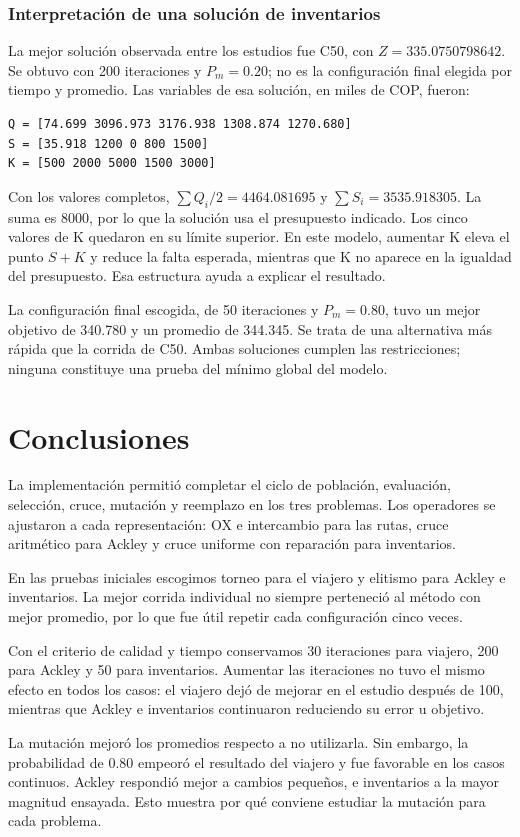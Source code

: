 \documentclass[conference]{IEEEtran}
\begin{document}
\subsubsection{Interpretación de una solución de inventarios}
La mejor solución observada entre los estudios fue C50, con $Z=335.0750798642$. Se obtuvo con 200 iteraciones y $P_m=0.20$; no es la configuración final elegida por tiempo y promedio.
Las variables de esa solución, en miles de COP, fueron:
\begin{lstlisting}
Q = [74.699 3096.973 3176.938 1308.874 1270.680]
S = [35.918 1200 0 800 1500]
K = [500 2000 5000 1500 3000]
\end{lstlisting}
Con los valores completos, $\sum Q_i/2=4464.081695$ y $\sum S_i=3535.918305$. La suma es 8000, por lo que la solución usa el presupuesto indicado. Los cinco valores de K quedaron en su límite superior. En este modelo, aumentar K eleva el punto $S+K$ y reduce la falta esperada, mientras que K no aparece en la igualdad del presupuesto. Esa estructura ayuda a explicar el resultado.

La configuración final escogida, de 50 iteraciones y $P_m=0.80$, tuvo un mejor objetivo de 340.780 y un promedio de 344.345. Se trata de una alternativa más rápida que la corrida de C50. Ambas soluciones cumplen las restricciones; ninguna constituye una prueba del mínimo global del modelo.
\section{Conclusiones}
La implementación permitió completar el ciclo de población, evaluación, selección, cruce, mutación y reemplazo en los tres problemas. Los operadores se ajustaron a cada representación: OX e intercambio para las rutas, cruce aritmético para Ackley y cruce uniforme con reparación para inventarios.

En las pruebas iniciales escogimos torneo para el viajero y elitismo para Ackley e inventarios. La mejor corrida individual no siempre perteneció al método con mejor promedio, por lo que fue útil repetir cada configuración cinco veces.

Con el criterio de calidad y tiempo conservamos 30 iteraciones para viajero, 200 para Ackley y 50 para inventarios. Aumentar las iteraciones no tuvo el mismo efecto en todos los casos: el viajero dejó de mejorar en el estudio después de 100, mientras que Ackley e inventarios continuaron reduciendo su error u objetivo.

La mutación mejoró los promedios respecto a no utilizarla. Sin embargo, la probabilidad de 0.80 empeoró el resultado del viajero y fue favorable en los casos continuos. Ackley respondió mejor a cambios pequeños, e inventarios a la mayor magnitud ensayada. Esto muestra por qué conviene estudiar la mutación para cada problema.
\end{document}
